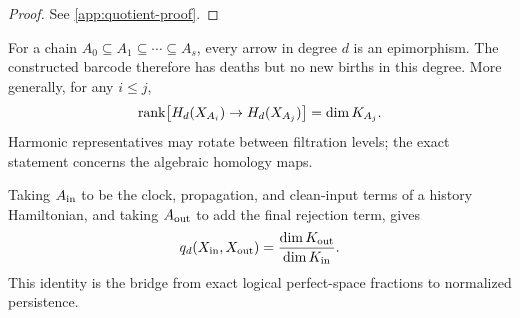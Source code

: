 \begin{proof}
See \cref{app:quotient-proof}.
\end{proof}

For a chain \(A_0\subseteq A_1\subseteq\cdots\subseteq A_s\), every arrow in degree \(d\) is an epimorphism. The constructed barcode therefore has deaths but no new births in this degree. More generally, for any \(i\le j\),
\[
\operatorname{rank}\bigl[H_d(X_{A_i})\to H_d(X_{A_j})\bigr]
=\dim K_{A_j}.
\]
Harmonic representatives may rotate between filtration levels; the exact
statement concerns the algebraic homology maps.

Taking \(A_{\rm in}\) to be the clock, propagation, and clean-input terms of a history Hamiltonian, and taking \(A_{\rm out}\) to add the final rejection term, gives
\begin{equation}
\label{eq:history-ratio}
q_d(X_{\mathrm{in}},X_{\mathrm{out}})
=\frac{\dim K_{\rm out}}{\dim K_{\rm in}}.
\end{equation}
This identity is the bridge from exact logical perfect-space fractions to normalized persistence.
